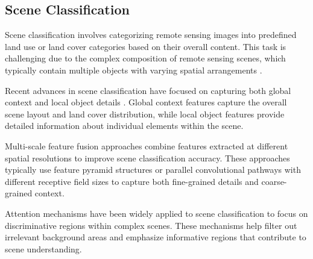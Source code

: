 \documentclass[12pt,a4paper]{article}
\begin{document}
\begin{table}[h!]
\centering
\caption{Comparison of Major Deep Learning Tasks in Remote Sensing.}
\label{tab:task_comparison}
\end{table}


\subsection{Scene Classification}
Scene classification involves categorizing remote sensing images into predefined land use or land cover categories based on their overall content. This task is challenging due to the complex composition of remote sensing scenes, which typically contain multiple objects with varying spatial arrangements \cite{xia2017aid}.

Recent advances in scene classification have focused on capturing both global context and local object details \cite{zeng2018improving}. Global context features capture the overall scene layout and land cover distribution, while local object features provide detailed information about individual elements within the scene.

Multi-scale feature fusion approaches combine features extracted at different spatial resolutions to improve scene classification accuracy. These approaches typically use feature pyramid structures or parallel convolutional pathways with different receptive field sizes to capture both fine-grained details and coarse-grained context.

Attention mechanisms have been widely applied to scene classification to focus on discriminative regions within complex scenes. These mechanisms help filter out irrelevant background areas and emphasize informative regions that contribute to scene understanding.
\end{document}
